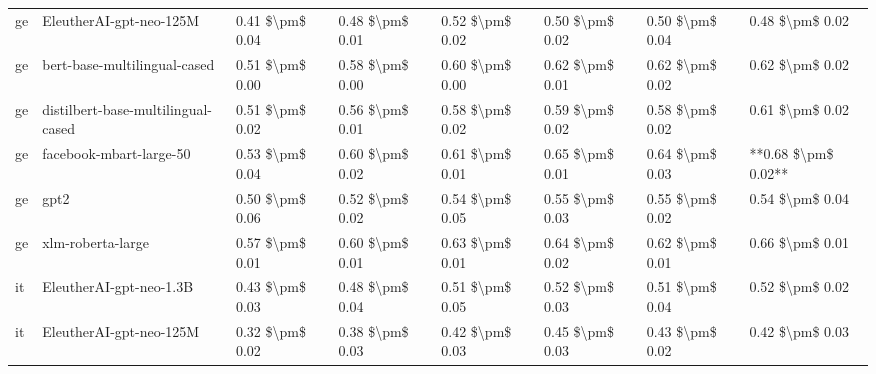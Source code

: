 \begin{tabular}{llllllll}
      ge &            EleutherAI-gpt-neo-125M & 0.41 \$\textbackslash pm\$ 0.04 &           0.48 \$\textbackslash pm\$ 0.01 &       0.52 \$\textbackslash pm\$ 0.02 &        0.50 \$\textbackslash pm\$ 0.02 &                         0.50 \$\textbackslash pm\$ 0.04 &     0.48 \$\textbackslash pm\$ 0.02 \\
      ge &       bert-base-multilingual-cased & 0.51 \$\textbackslash pm\$ 0.00 &           0.58 \$\textbackslash pm\$ 0.00 &       0.60 \$\textbackslash pm\$ 0.00 &        0.62 \$\textbackslash pm\$ 0.01 &                         0.62 \$\textbackslash pm\$ 0.02 &     0.62 \$\textbackslash pm\$ 0.02 \\
      ge & distilbert-base-multilingual-cased & 0.51 \$\textbackslash pm\$ 0.02 &           0.56 \$\textbackslash pm\$ 0.01 &       0.58 \$\textbackslash pm\$ 0.02 &        0.59 \$\textbackslash pm\$ 0.02 &                         0.58 \$\textbackslash pm\$ 0.02 &     0.61 \$\textbackslash pm\$ 0.02 \\
      ge &            facebook-mbart-large-50 & 0.53 \$\textbackslash pm\$ 0.04 &           0.60 \$\textbackslash pm\$ 0.02 &       0.61 \$\textbackslash pm\$ 0.01 &        0.65 \$\textbackslash pm\$ 0.01 &                         0.64 \$\textbackslash pm\$ 0.03 & **0.68 \$\textbackslash pm\$ 0.02** \\
      ge &                               gpt2 & 0.50 \$\textbackslash pm\$ 0.06 &           0.52 \$\textbackslash pm\$ 0.02 &       0.54 \$\textbackslash pm\$ 0.05 &        0.55 \$\textbackslash pm\$ 0.03 &                         0.55 \$\textbackslash pm\$ 0.02 &     0.54 \$\textbackslash pm\$ 0.04 \\
      ge &                  xlm-roberta-large & 0.57 \$\textbackslash pm\$ 0.01 &           0.60 \$\textbackslash pm\$ 0.01 &       0.63 \$\textbackslash pm\$ 0.01 &        0.64 \$\textbackslash pm\$ 0.02 &                         0.62 \$\textbackslash pm\$ 0.01 &     0.66 \$\textbackslash pm\$ 0.01 \\
      it &            EleutherAI-gpt-neo-1.3B & 0.43 \$\textbackslash pm\$ 0.03 &           0.48 \$\textbackslash pm\$ 0.04 &       0.51 \$\textbackslash pm\$ 0.05 &        0.52 \$\textbackslash pm\$ 0.03 &                         0.51 \$\textbackslash pm\$ 0.04 &     0.52 \$\textbackslash pm\$ 0.02 \\
      it &            EleutherAI-gpt-neo-125M & 0.32 \$\textbackslash pm\$ 0.02 &           0.38 \$\textbackslash pm\$ 0.03 &       0.42 \$\textbackslash pm\$ 0.03 &        0.45 \$\textbackslash pm\$ 0.03 &                         0.43 \$\textbackslash pm\$ 0.02 &     0.42 \$\textbackslash pm\$ 0.03 \\

\end{tabular}
